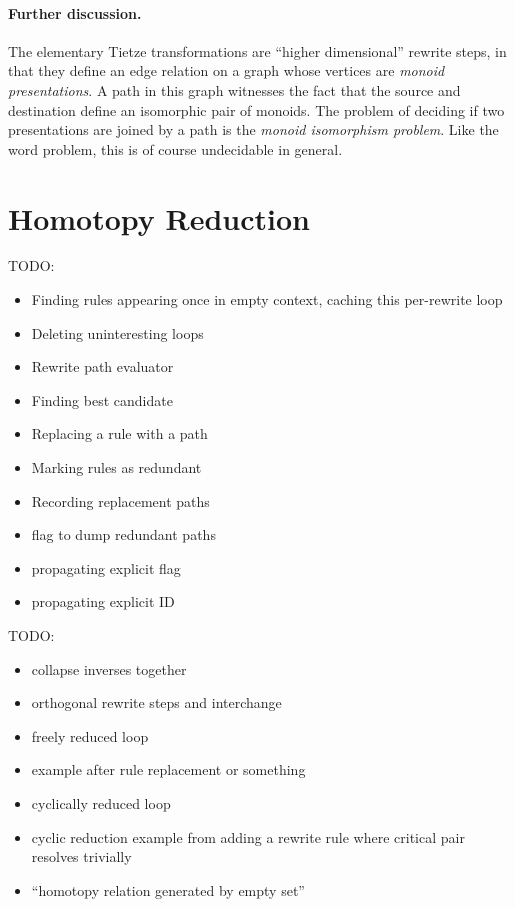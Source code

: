 \documentclass[../generics]{subfiles}
\begin{document}
\paragraph{Further discussion.}
The elementary Tietze transformations are ``higher dimensional'' rewrite steps, in that they define an edge relation on a graph whose vertices are \emph{monoid presentations}. A path in this graph witnesses the fact that the source and destination define an isomorphic pair of monoids. The problem of deciding if two presentations are joined by a path is the \emph{monoid isomorphism problem}. Like the word problem, this is of course undecidable in general.

\fi

\section[]{Homotopy Reduction}\label{homotopy reduction}


\ifWIP
TODO:
\begin{itemize}
\item Finding rules appearing once in empty context, caching this per-rewrite loop
\item Deleting uninteresting loops
\item Rewrite path evaluator
\item Finding best candidate
\item Replacing a rule with a path
\item Marking rules as redundant
\item Recording replacement paths
\item flag to dump redundant paths
\item propagating explicit flag
\item propagating explicit ID
\end{itemize}
\fi

\ifWIP
\cite{homotopyreduction}

TODO:
\begin{itemize}
\item collapse inverses together
\item orthogonal rewrite steps and interchange
\item freely reduced loop
\item example after rule replacement or something
\item cyclically reduced loop
\item cyclic reduction example from adding a rewrite rule where critical pair resolves trivially
\item ``homotopy relation generated by empty set''
\end{itemize}
\fi
\end{document}
